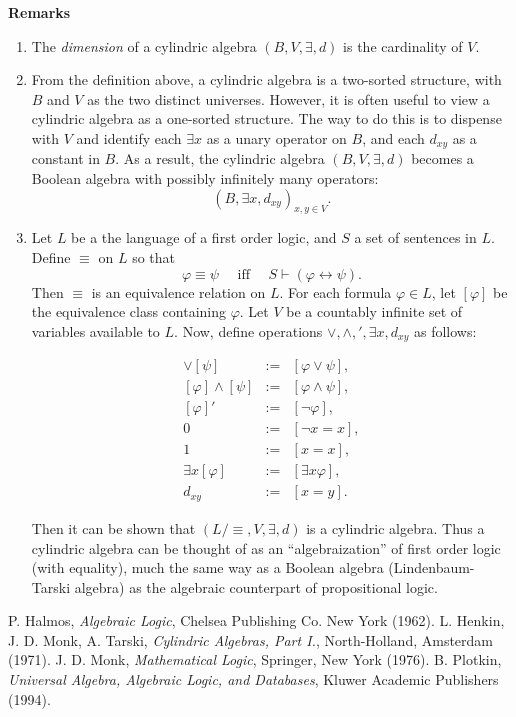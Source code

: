\documentclass[12pt]{article}
\begin{document}
\textbf{Remarks}
\begin{enumerate}
\item The \emph{dimension} of a cylindric algebra $(B,V,\exists,d)$ is the cardinality of $V$.
\item From the definition above, a cylindric algebra is a two-sorted structure, with $B$ and $V$ as the two distinct universes.  However, it is often useful to view a cylindric algebra as a one-sorted structure.  The way to do this is to dispense with $V$ and identify each $\exists x$ as a unary operator on $B$, and each $d_{xy}$ as a constant in $B$.  As a result, the cylindric algebra $(B,V,\exists,d)$ becomes a Boolean algebra with possibly infinitely many operators: $$(B,\exists x,d_{xy})_{x,y\in V}.$$
\item Let $L$ be a the language of a first order logic, and $S$ a set of sentences in $L$.  Define $\equiv$ on $L$ so that $$\varphi \equiv \psi\quad \mbox{ iff }\quad S \vdash (\varphi\leftrightarrow \psi).$$  Then $\equiv$ is an equivalence relation on $L$.  For each formula $\varphi\in L$, let $[\varphi]$ be the equivalence class containing $\varphi$.  Let $V$ be a countably infinite set of variables available to $L$.  Now, define operations $\vee,\wedge,',\exists x,d_{xy}$ as follows:
\begin{center}
\begin{eqnarray}
[\varphi] \vee [\psi] &:=& [\varphi \vee \psi], \\ 
\left[ \varphi \right] \wedge [\psi] &:=& [\varphi \wedge \psi], \\ 
\left[ \varphi \right]' &:=& [\neg \varphi], \\ 
0 &:=& [\neg  x=x], \\ 
1 &:=& [x=x], \\
\exists x[\varphi] &:=& [\exists x \varphi], \\
d_{xy} &:=& [x=y].
\end{eqnarray}
\end{center}
Then it can be shown that $(L/\equiv, V,\exists,d)$ is a cylindric algebra.  Thus a cylindric algebra can be thought of as an ``algebraization'' of first order logic (with equality), much the same way as a Boolean algebra (Lindenbaum-Tarski algebra) as the algebraic counterpart of propositional logic.
\end{enumerate}

\begin{thebibliography}{8}
 P. Halmos, \emph{Algebraic Logic}, Chelsea Publishing Co. New York (1962).
 L. Henkin, J. D. Monk, A. Tarski, \emph{Cylindric Algebras, Part I.}, North-Holland, Amsterdam (1971).
 J. D. Monk, \emph{Mathematical Logic}, Springer, New York (1976).
 B. Plotkin, \emph{Universal Algebra, Algebraic Logic, and Databases}, Kluwer Academic Publishers (1994).
\end{thebibliography}
\end{document}
